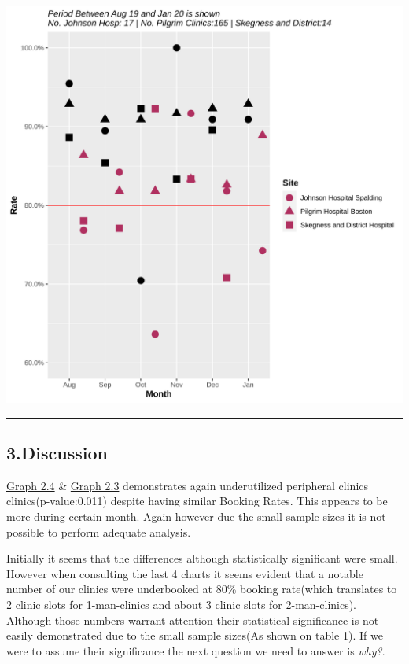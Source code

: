 \documentclass[]{article}
\begin{document}
\begin{center}\includegraphics{LF2_files/figure-latex/unnamed-chunk-9-1} \end{center}

\begin{center}\rule{0.5\linewidth}{0.5pt}\end{center}

\hypertarget{discussion}{%
\subsection{3.Discussion}\label{discussion}}

\protect\hyperlink{graph-2.4}{Graph 2.4} \&
\protect\hyperlink{graph-2.3}{Graph 2.3} demonstrates again
underutilized peripheral clinics clinics(p-value:0.011) despite having
similar Booking Rates. This appears to be more during certain month.
Again however due the small sample sizes it is not possible to perform
adequate analysis.

Initially it seems that the differences although statistically
significant were small. However when consulting the last 4 charts it
seems evident that a notable number of our clinics were underbooked at
80\% booking rate(which translates to 2 clinic slots for 1-man-clinics
and about 3 clinic slots for 2-man-clinics). Although those numbers
warrant attention their statistical significance is not easily
demonstrated due to the small sample sizes(As shown on table 1). If we
were to assume their significance the next question we need to answer is
\emph{why?}.
\end{document}
